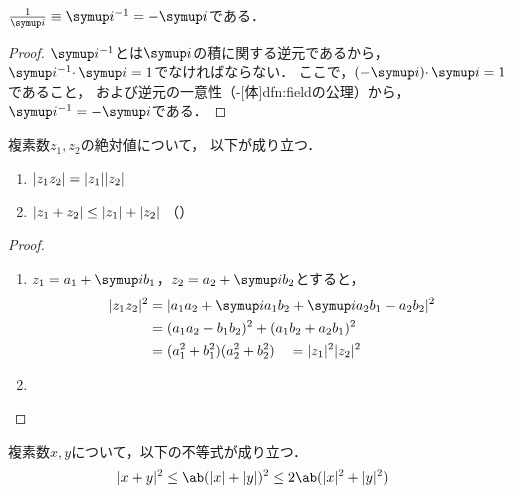 \documentclass[../sotsu.tex]{subfiles}
\begin{document}
\begin{proposition}
    $\frac{1}{\iu} \equiv \iu^{-1} = -\iu$である．
\end{proposition}

\begin{proof}
    $\iu^{-1}$とは$\iu$の積に関する逆元であるから，
    $\iu^{-1} \cdotp \iu = 1$でなければならない．
    ここで，$(-\iu) \cdotp \iu = 1$であること，
    および逆元の一意性（-[体]{dfn:field}の公理）から，$\iu^{-1} = -\iu$である．
\end{proof}

\begin{proposition}
    複素数$z_1, z_2$の絶対値について，
    以下が成り立つ．
    \begin{enumerate}
        \item $\lvert z_1 z_2\rvert = \lvert z_1\rvert \lvert z_2\rvert$
        \item $\lvert z_1 + z_2\rvert \leq \lvert z_1\rvert + \lvert z_2\rvert$
            （）
    \end{enumerate}
\end{proposition}

\begin{proof}
    \begin{enumerate}
        \item $z_1 = a_1 + \iu b_1$，$z_2 = a_2 + \iu b_2$とすると，
            \begin{equation*}
                \begin{split}
                    \abs{z_1 z_2}^2 
                        &= \abs{ a_1 a_2 + \iu a_1 b_2 + \iu a_2 b_1 - a_2 b_2 }^2   \\
                        &= (a_1 a_2 - b_1 b_2)^2 + (a_1 b_2 + a_2 b_1)^2   \\
                        &= (a_1^2 + b_1^2) (a_2^2 + b_2^2)
                        \quad = \abs{z_1}^2 \abs{z_2}^2
                \end{split}
            \end{equation*}
        \item 
    \end{enumerate}
\end{proof}


\begin{proposition}
    複素数$x, y$について，以下の不等式が成り立つ．
    \begin{align}
        \label{eq:complex-abs-squared}
        \abs{x + y}^2 
            &\leq \ab( \abs{x} + \abs{y} )^2 
            \leq 2\ab( \abs{x}^2 + \abs{y}^2 )
    \end{align}
\end{proposition}
\end{document}
